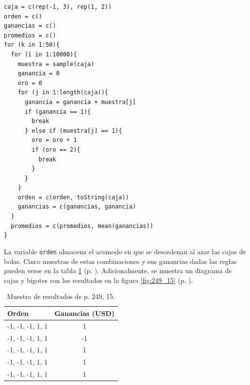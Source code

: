 \documentclass[paper=leter, fontsize=11pt]{scrartcl}
\begin{document}
\begin{lstlisting}[caption={P. 249, 15}, captionpos=t, label=249_15]
caja = c(rep(-1, 3), rep(1, 2))
orden = c()
ganancias = c()
promedios = c()
for (k in 1:50){
  for (i in 1:10000){
    muestra = sample(caja)
    ganancia = 0
    oro = 0
    for (j in 1:length(caja)){
      ganancia = ganancia + muestra[j]
      if (ganancia == 1){
        break
      } else if (muestra[j] == 1){
        oro = oro + 1
        if (oro == 2){
          break
        }
      }
    }
    orden = c(orden, toString(caja))
    ganancias = c(ganancias, ganancia)
  }
  promedios = c(promedios, mean(ganancias))
}
\end{lstlisting}

La variable \texttt{orden} almacena el acomodo en que se desordenan al azar las cajas de bolas. Cinco muestras de estas combinaciones y sus ganancias dadas las reglas pueden verse en la tabla \ref{tabla:249_15} (p. \pageref{tabla:249_15}). Adicionalmente, se muestra un diagrama de cajas y bigotes con los resultados en la figura \ref{fig:249_15} (p. \pageref{fig:249_15}).

\begin{table}
    \centering
    \caption{Muestra de resultados de p. 249, 15.}
    \label{tabla:249_15}
    \begin{tabular}{lc}
      \hline
        Orden & Ganancias (USD) \\ 
      \hline
        -1, -1, -1, 1, 1 & 1 \\ 
        -1, -1, -1, 1, 1 & -1 \\ 
        -1, -1, -1, 1, 1 & 1 \\ 
        -1, -1, -1, 1, 1 & 1 \\ 
        -1, -1, -1, 1, 1 & 1 \\ 
       \hline
    \end{tabular}
\end{table}
\end{document}
